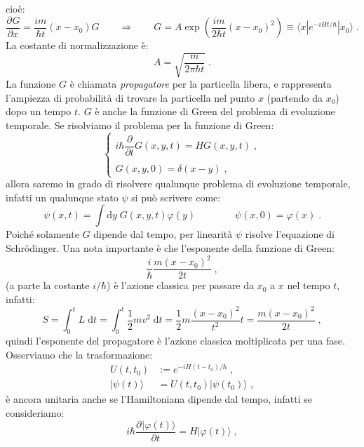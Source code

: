 \documentclass[10pt,a4paper]{report}
\theoremstyle{definition}
\newcommand{\pdev}[3][]{\frac{\partial^{#1} #2}{\partial #3^{#1}}}
\numberwithin{equation}{section}
\newcommand{\diff}[1][]{\mathrm{d}#1}
\newcommand{\bra}{\langle}
\newcommand{\ket}{\rangle}
\newcommand{\Sch}{Schrödinger}
\begin{document}
cioè:
\begin{equation}
\pdev{G}{x}=\frac{im}{\hbar t}(x-x_0)G \qquad \Longrightarrow \qquad G=A\exp\left(\frac{im}{2\hbar t}(x-x_0)^2\right)\equiv \bra x|e^{-iHt/\hbar}|x_0\ket\;.
\end{equation}
La costante di normalizzazione è:
\begin{equation}
A=\sqrt{\frac{m}{2\pi\hbar t}}\;.
\end{equation}
La funzione $G$ è chiamata \textit{propagatore} per la particella libera, e rappresenta l'ampiezza di probabilità di trovare la particella nel punto $x$ (partendo da $x_0$) dopo un tempo $t$. $G$ è anche la funzione di Green del problema di evoluzione temporale. Se risolviamo il problema per la funzione di Green:
\begin{equation}
\begin{cases}
i\hbar \dfrac{\partial}{\partial t}G(x,y,t)=HG(x,y,t)\;, \\
\\
G(x,y,0)=\delta(x-y)\;,
\end{cases}
\end{equation}
allora saremo in grado di risolvere qualunque problema di evoluzione temporale, infatti un qualunque stato $\psi$ si può scrivere come:
\begin{equation}
\psi(x,t)=\int\diff{y}\; G(x,y,t)\varphi(y) \qquad\qquad \psi(x,0)=\varphi(x)\;.
\end{equation}
Poiché solamente $G$ dipende dal tempo, per linearità $\psi$ risolve l'equazione di \Sch. Una nota importante è che l'esponente della funzione di Green:
\begin{equation}
\frac{i}{\hbar}\frac{m(x-x_0)^2}{2t}\;,
\end{equation}
(a parte la costante $i/\hbar$) è l'azione classica per passare da $x_0$ a $x$ nel tempo $t$, infatti:
\begin{equation}
S=\int_0^t L\;\diff{t}=\int_0^t \frac{1}{2}mv^2\;\diff{t}=\frac{1}{2}m\frac{(x-x_0)^2}{t^2}t=\frac{m(x-x_0)^2}{2t}\;,
\end{equation}
quindi l'esponente del propagatore è l'azione classica moltiplicata per una fase. \\
Osserviamo che la trasformazione:
\begin{align*}
U(t,t_0) &:=e^{-iH(t-t_0)/\hbar}\;, \\
|\psi(t)\ket &= U(t,t_0)|\psi(t_0)\ket\;,
\end{align*}
è ancora unitaria anche se l'Hamiltoniana dipende dal tempo, infatti se consideriamo:
\begin{equation}
i\hbar\pdev{|\varphi(t)\ket}{t}=H|\varphi(t)\ket\;,
\end{equation}
\end{document}

